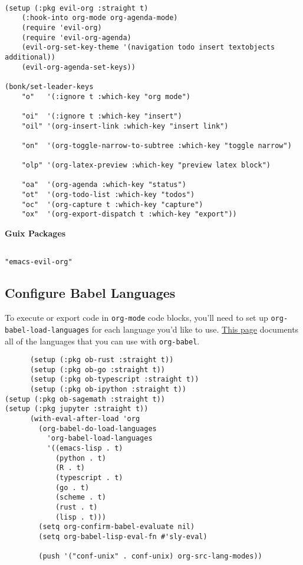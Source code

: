 \documentclass[11pt]{article}
\begin{document}
\begin{verbatim}

(setup (:pkg evil-org :straight t)
    (:hook-into org-mode org-agenda-mode)
    (require 'evil-org)
    (require 'evil-org-agenda)
    (evil-org-set-key-theme '(navigation todo insert textobjects additional))
    (evil-org-agenda-set-keys))

(bonk/set-leader-keys
    "o"   '(:ignore t :which-key "org mode")

    "oi"  '(:ignore t :which-key "insert")
    "oil" '(org-insert-link :which-key "insert link")

    "on"  '(org-toggle-narrow-to-subtree :which-key "toggle narrow")

    "olp" '(org-latex-preview :which-key "preview latex block")

    "oa"  '(org-agenda :which-key "status")
    "ot"  '(org-todo-list :which-key "todos")
    "oc"  '(org-capture t :which-key "capture")
    "ox"  '(org-export-dispatch t :which-key "export"))

\end{verbatim}

\textbf{Guix Packages}

\begin{verbatim}

"emacs-evil-org"

\end{verbatim}
\subsection{Configure Babel Languages}
\label{sec:org15ced7e}

To execute or export code in \texttt{org-mode} code blocks, you'll need to set up \texttt{org-babel-load-languages} for each language you'd like to use.  \href{https://orgmode.org/worg/org-contrib/babel/languages.html}{This page} documents all of the languages that you can use with \texttt{org-babel}.

\begin{verbatim}
      (setup (:pkg ob-rust :straight t))
      (setup (:pkg ob-go :straight t))
      (setup (:pkg ob-typescript :straight t))
      (setup (:pkg ob-ipython :straight t))
(setup (:pkg ob-sagemath :straight t))
(setup (:pkg jupyter :straight t))
      (with-eval-after-load 'org
        (org-babel-do-load-languages
          'org-babel-load-languages
          '((emacs-lisp . t)
            (python . t)
            (R . t)
            (typescript . t)
            (go . t)
            (scheme . t)
            (rust . t)
            (lisp . t)))
        (setq org-confirm-babel-evaluate nil)
        (setq org-babel-lisp-eval-fn #'sly-eval)

        (push '("conf-unix" . conf-unix) org-src-lang-modes))
\end{verbatim}
\end{document}
